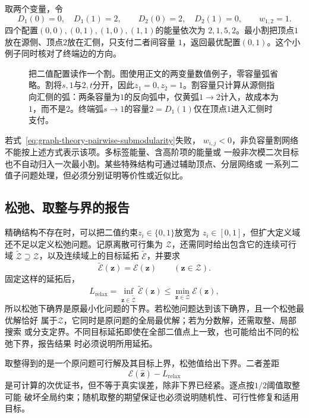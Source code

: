 取两个变量，令
\[
  D_1(0)=0,\quad D_1(1)=2,\qquad
  D_2(0)=2,\quad D_2(1)=0,\qquad
  w_{1,2}=1.
\]
四个配置\((0,0),(0,1),(1,0),(1,1)\)的能量依次为
\(2,1,5,2\)。最小割把顶点\(1\)放在源侧、顶点\(2\)放在汇侧，只支付二者间容量
\(1\)，返回最优配置\((0,1)\)。这个小例子同时核对了终端边的方向。

\begin{figure}[htbp]
  \centering
  
  \caption{把二值配置读作一个割。图使用正文的两变量数值例子，零容量弧省略。割将\(s,1\)与\(2,t\)分开，因此\(z_1=0,z_2=1\)。割容量只计算从源侧指向汇侧的弧：两条容量为\(1\)的反向弧中，仅黄弧\(1\to2\)计入，故成本为\(1\)，而不是\(2\)。终端弧\(s\to1\)的容量\(2=D_1(1)\)仅在顶点\(1\)进入汇侧时支付。}
  \label{fig:graph-theory-binary-energy-cut}
\end{figure}

若式~\eqref{eq:graph-theory-pairwise-submodularity}失败，
\(w_{i,j}<0\)，非负容量割网络不能按上述方式表示该项。多标签能量、含高阶项的能量或
一般非次模二次目标也不自动归入一次最小割。某些特殊结构可通过辅助顶点、分层网络或
一系列二值子问题处理，但必须分别证明等价性或近似比。

\subsection{松弛、取整与界的报告}

精确结构不存在时，可以把二值约束\(z_i\in\{0,1\}\)放宽为
\(z_i\in[0,1]\)，但扩大定义域还不足以定义松弛问题。记原离散可行集为
\(\mathcal{Z}\)，还需同时给出包含它的连续可行域
\(\widetilde{\mathcal{Z}}\supseteq\mathcal{Z}\)，以及连续域上的目标延拓
\(\widetilde{\mathcal{E}}\)，并要求
\[
  \widetilde{\mathcal{E}}(\bm{z})=\mathcal{E}(\bm{z})
  \qquad(\bm{z}\in\mathcal{Z}).
\]
固定这样的延拓后，
\[
  L_{\mathrm{relax}}
  =\inf_{\bm{z}\in\widetilde{\mathcal{Z}}}
    \widetilde{\mathcal{E}}(\bm{z})
  \leq
  \min_{\bm{z}\in\mathcal{Z}}\mathcal{E}(\bm{z}),
\]
所以松弛下确界是原最小化问题的下界。若松弛问题达到该下确界，且一个松弛最优解恰好
属于\(\mathcal{Z}\)，它同时是原问题的全局最优解；若为分数解，还需取整、局部搜索
或分支定界。不同目标延拓即使在全部二值点上一致，也可能给出不同的松弛下界，报告结果
时必须说明所用延拓。

取整得到的是一个原问题可行解及其目标上界，松弛值给出下界。二者差距
\[
  \mathcal{E}(\widehat{\bm{z}})-L_{\mathrm{relax}}
\]
是可计算的次优证书，但不等于真实误差，除非下界已经紧。逐点按\(1/2\)阈值取整可能
破坏全局约束；随机取整的期望保证也必须说明随机性、可行性修复和适用目标。


